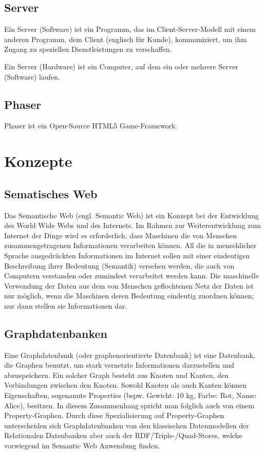 \documentclass[11pt,a4paper]{article}
\begin{document}
\subsection{Server}
Ein Server (Software) ist ein Programm, das im Client-Server-Modell mit einem anderen Programm, dem Client (englisch für Kunde), kommuniziert, um ihm Zugang zu speziellen Dienstleistungen zu verschaffen. \par\bigskip

Ein Server (Hardware) ist ein Computer, auf dem ein oder mehrere Server (Software) laufen.

\subsection{Phaser}
Phaser ist ein Open-Source HTML5 Game-Framework.
\section{Konzepte}
\subsection{Sematisches Web}
Das Semantische Web (engl. Semantic Web) ist ein Konzept bei der Entwicklung des World Wide Webs und des   Internets. Im Rahmen zur Weiterentwicklung zum Internet der Dinge wird es erforderlich, dass Maschinen die von   Menschen  zusammengetragenen Informationen verarbeiten können. All die   in  menschlicher Sprache ausgedrückten Informationen im Internet sollen   mit  einer eindeutigen Beschreibung ihrer Bedeutung (Semantik)   versehen  werden, die auch von Computern verstanden oder zumindest   verarbeitet  werden kann. Die maschinelle Verwendung der Daten aus dem   von Menschen  geflochtenen Netz der Daten ist nur möglich, wenn die   Maschinen deren  Bedeutung eindeutig zuordnen können; nur dann stellen   sie Informationen  dar.

\subsection{Graphdatenbanken}
Eine Graphdatenbank (oder graphenorientierte Datenbank) ist eine Datenbank, die Graphen benutzt, um stark vernetzte Informationen darzustellen und abzuspeichern. Ein solcher Graph besteht aus Knoten und Kanten, den Verbindungen zwischen den Knoten. Sowohl Knoten als auch Kanten können Eigenschaften, sogenannte Properties (bspw. Gewicht: 10 kg, Farbe: Rot, Name: Alice), besitzen. In diesem Zusammenhang spricht man folglich auch von einem Property-Graphen. Durch diese Spezialisierung auf Property-Graphen unterscheiden sich Graphdatenbanken von den klassischen Datenmodellen der Relationalen Datenbanken aber auch der RDF/Triple-/Quad-Stores, welche vorwiegend im Semantic Web Anwendung finden.
\end{document}
